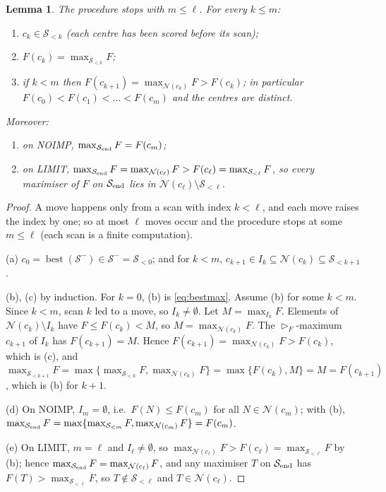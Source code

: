 \documentclass[11pt]{article}
\newtheorem{lemma}{Lemma}
\theoremstyle{remark}
\newcommand{\cS}{\mathcal{S}}
\newcommand{\cN}{\mathcal{N}}
\newcommand{\best}{\operatorname{best}}
\newcommand{\NOIMP}{\textsf{NOIMP}}
\newcommand{\LIMIT}{\textsf{LIMIT}}
\begin{document}
\begin{lemma}\label{lem:inv}
The procedure stops with $m\le\ell$. For every $k\le m$:
\begin{enumerate}[label=(\alph*)]
\item $c_k\in\cS_{<k}$ (each centre has been scored before its scan);
\item $F(c_k)=\max_{\cS_{<k}}F$;
\item if $k<m$ then $F(c_{k+1})=\max_{\cN(c_k)}F>F(c_k)$; in particular $F(c_0)<F(c_1)<\dots<F(c_m)$ and the centres are distinct.
\end{enumerate}
Moreover:
\begin{enumerate}[label=(\alph*),resume]
\item on \NOIMP, $\max_{\cS_{\rm end}}F=F(c_m)$;
\item on \LIMIT, $\max_{\cS_{\rm end}}F=\max_{\cN(c_\ell)}F>F(c_\ell)=\max_{\cS_{<\ell}}F$, so every maximiser of $F$ on $\cS_{\rm end}$ lies in $\cN(c_\ell)\setminus\cS_{<\ell}$.
\end{enumerate}
\end{lemma}
\begin{proof}
A move happens only from a scan with index $k<\ell$, and each move raises the index by one; so at most $\ell$ moves occur and the procedure stops at some $m\le\ell$ (each scan is a finite computation).

(a) $c_0=\best(\cS^-)\in\cS^-=\cS_{<0}$; and for $k<m$, $c_{k+1}\in I_k\subseteq\cN(c_k)\subseteq\cS_{<k+1}$.

(b), (c) by induction. For $k=0$, (b) is \eqref{eq:bestmax}. Assume (b) for some $k<m$. Since $k<m$, scan $k$ led to a move, so $I_k\ne\emptyset$. Let $M=\max_{I_k}F$. Elements of $\cN(c_k)\setminus I_k$ have $F\le F(c_k)<M$, so $M=\max_{\cN(c_k)}F$. The $\rhd_F$-maximum $c_{k+1}$ of $I_k$ has $F(c_{k+1})=M$. Hence $F(c_{k+1})=\max_{\cN(c_k)}F>F(c_k)$, which is (c), and
$\max_{\cS_{<k+1}}F=\max\{\max_{\cS_{<k}}F,\max_{\cN(c_k)}F\}=\max\{F(c_k),M\}=M=F(c_{k+1})$, which is (b) for $k+1$.

(d) On \NOIMP, $I_m=\emptyset$, i.e.\ $F(N)\le F(c_m)$ for all $N\in\cN(c_m)$; with (b), $\max_{\cS_{\rm end}}F=\max\{\max_{\cS_{<m}}F,\max_{\cN(c_m)}F\}=F(c_m)$.

(e) On \LIMIT, $m=\ell$ and $I_\ell\ne\emptyset$, so $\max_{\cN(c_\ell)}F>F(c_\ell)=\max_{\cS_{<\ell}}F$ by (b); hence $\max_{\cS_{\rm end}}F=\max_{\cN(c_\ell)}F$, and any maximiser $T$ on $\cS_{\rm end}$ has $F(T)>\max_{\cS_{<\ell}}F$, so $T\notin\cS_{<\ell}$ and $T\in\cN(c_\ell)$.
\end{proof}
\end{document}
